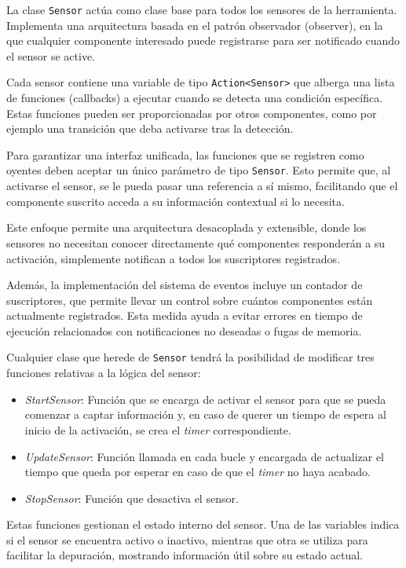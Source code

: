 La clase \texttt{Sensor} actúa como clase base para todos los sensores de la herramienta. Implementa una arquitectura basada en el patrón observador (observer), en la que cualquier componente interesado puede registrarse para ser notificado cuando el sensor se active.

Cada sensor contiene una variable de tipo \texttt{Action<Sensor>} que alberga una lista de funciones (callbacks) a ejecutar cuando se detecta una condición específica. Estas funciones pueden ser proporcionadas por otros componentes, como por ejemplo una transición que deba activarse tras la detección.

Para garantizar una interfaz unificada, las funciones que se registren como oyentes deben aceptar un único parámetro de tipo \texttt{Sensor}. Esto permite que, al activarse el sensor, se le pueda pasar una referencia a sí mismo, facilitando que el componente suscrito acceda a su información contextual si lo necesita.

Este enfoque permite una arquitectura desacoplada y extensible, donde los sensores no necesitan conocer directamente qué componentes responderán a su activación, simplemente notifican a todos los suscriptores registrados.

Además, la implementación del sistema de eventos incluye un contador de suscriptores, que permite llevar un control sobre cuántos componentes están actualmente registrados. Esta medida ayuda a evitar errores en tiempo de ejecución relacionados con notificaciones no deseadas o fugas de memoria.

Cualquier clase que herede de \texttt{Sensor} tendrá la posibilidad de modificar tres funciones relativas a la lógica del sensor:

\begin{itemize}
	\item \textit{StartSensor}: Función que se encarga de activar el sensor para que se pueda comenzar a captar información y, en caso de querer un tiempo de espera al inicio de la activación, se crea el \textit{timer} correspondiente.
	\item \textit{UpdateSensor}: Función llamada en cada bucle y encargada de actualizar el tiempo que queda por esperar en caso de que el \textit{timer} no haya acabado.
	\item \textit{StopSensor}: Función que desactiva el sensor.
\end{itemize}
Estas funciones gestionan el estado interno del sensor. Una de las variables indica si el sensor se encuentra activo o inactivo, mientras que otra se utiliza para facilitar la depuración, mostrando información útil sobre su estado actual.\\

